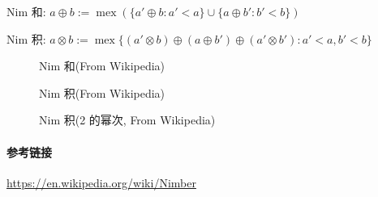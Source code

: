 Nim 和: \(a\oplus b:=\operatorname{mex}\left(\{a'\oplus b:a'<a\}\cup\{a\oplus b':b'<b\}\right)\)

Nim 积: \(a\otimes b:=\operatorname{mex}\{(a'\otimes b)\oplus(a\oplus b')\oplus(a'\otimes b'):a'<a,b'<b\}\)

\begin{figure}
    \label{img:nim-add}
    \centering
    
    \caption{Nim 和(From Wikipedia)}
\end{figure}

\begin{figure}
    \label{img:nim-prod}
    \centering
    
    \caption{Nim 积(From Wikipedia)}
\end{figure}

\begin{figure}
    \label{img:nim-prod-pow2}
    \centering
    
    \caption{Nim 积(2 的幂次, From Wikipedia)}
\end{figure}

\paragraph{参考链接}

\url{https://en.wikipedia.org/wiki/Nimber}
